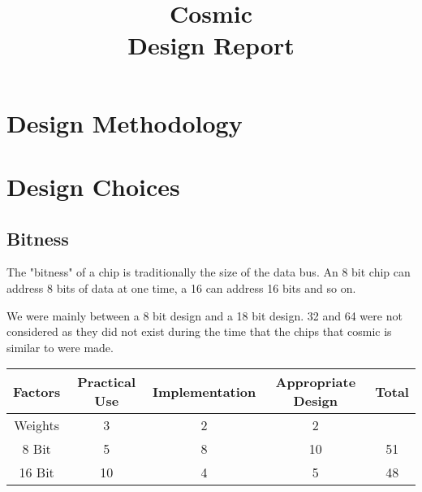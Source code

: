 \documentclass[conference]{IEEEtran}
\begin{document}
\title{
 Cosmic\\Design Report}

\author{
\and
{}

}

\maketitle

\section{Design Methodology}



\section{Design Choices}
\subsection{Bitness}
The "bitness" of a chip is traditionally the size of the data bus. An 8 bit chip can address 8 bits of data at one time, a 16 can address 16 bits and so on.

We were mainly between a 8 bit design and a 18 bit design. 32 and 64 were not considered as they did not exist during the time that the chips that cosmic is similar to were made.

\begin{center}
 \begin{tabular}{||c|c|c|c|c||} 
 \hline
 Factors & Practical Use & Implementation & Appropriate Design & \cellcolor{blue!40}Total\\ [0.5ex] 
 \hline\hline
 Weights & 3 & 2 & 2& \\ 
 \hline
 8 Bit & 5 &  8&  10 & \cellcolor{blue!25}51\\
 \hline
 16 Bit &  10 & 4 &  5 & \cellcolor{blue!25}48\\
 \hline
\end{tabular}
\end{center}
\end{document}
